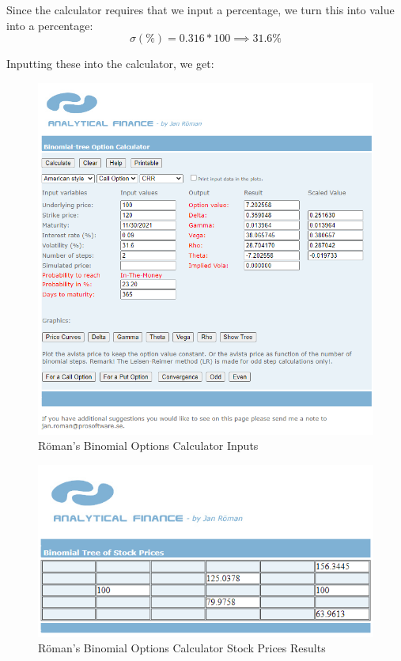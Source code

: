 \documentclass[12pt, letterpaper]{article}\usepackage{float}
\begin{document}
Since the calculator requires that we input a percentage, we turn this into value into a percentage:
\begin{equation*}
    \sigma (\%) = 0.316 * 100 \implies 31.6\%
\end{equation*}

\pagebreak

\noindent Inputting these into the calculator, we get:
\begin{figure}[H]
  \includegraphics[scale=0.8]{Roman_binomial_calculator_inputs}
  \caption{R\"{o}man's Binomial Options Calculator Inputs}
\end{figure}

\begin{figure}[H]
  \includegraphics{Roman_binomial_calculator_stock_prices}
  \caption{R\"{o}man's Binomial Options Calculator Stock Prices Results}
\end{figure}
\end{document}
